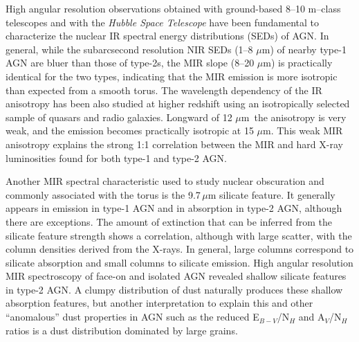 \documentclass{natureprintstyle}
\def\micron{$\mu$m}
\begin{document}
High angular resolution observations obtained with ground-based 8--10 m--class telescopes and with the  {\it Hubble Space Telescope} have been fundamental to characterize 
the nuclear IR spectral energy distributions (SEDs) of AGN\cite{Alonso03,Ramos09,Prieto10,Asmus14}. In general, 
while the subarcsecond resolution NIR SEDs
(1--8 \micron) of nearby type-1 AGN are {bluer} than those of type-2s, the MIR slope (8--20 \micron) is practically identical for the two types\cite{Levenson09,Prieto10,Ramos11,Asmus14}, 
indicating that the MIR emission is more isotropic than expected from a smooth torus\cite{Pier92,Pier93}. {The wavelength dependency of the IR anisotropy has been also studied 
at higher redshift using an isotropically selected sample of quasars and radio galaxies\cite{Honig11}. Longward of 12 \micron~the anisotropy is very weak, 
and the emission becomes practically isotropic at 15 \micron.} This weak MIR anisotropy explains the strong 1:1 correlation between the MIR and hard X-ray luminosities 
found for both type-1 and type-2 AGN\cite{Krabbe01,Lutz:2004gf,Asmus15}. 

Another MIR spectral characteristic used to study nuclear obscuration and commonly associated with the torus is the 9.7\,$\mu$m silicate feature. 
It generally appears in emission in type-1 AGN and in absorption in type-2 AGN, although there are exceptions\cite{Roche91,Mason09}. The amount of extinction that can be inferred from the silicate feature strength shows a correlation, although with large scatter, with the column densities derived from the X-rays\cite{Shi06}. {In general,} large columns correspond to silicate absorption and small columns to silicate emission. High angular resolution MIR spectroscopy of face-on and isolated AGN {revealed shallow silicate features in type-2 AGN\cite{Roche06,Alonso16}. A clumpy distribution of dust naturally produces these shallow absorption features, but another interpretation to explain this and other ``anomalous'' dust properties in AGN such as the reduced E$_{B-V}$/N$_H$ and A$_V$/N$_H$ ratios is a dust distribution dominated by large grains\cite{Maiolino01}.} 

\end{document}

